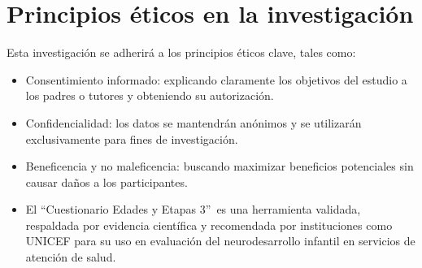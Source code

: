 \documentclass[11pt,letterpaper]{report}
\newcommand{\asq}{“Cuestionario Edades y Etapas 3”}
\begin{document}
\section{Principios éticos en la investigación}
Esta investigación se adherirá a los principios éticos clave, tales como:
\begin{itemize}
	\item Consentimiento informado: explicando claramente los objetivos del
	estudio a los padres o tutores y obteniendo su autorización.

	\item Confidencialidad: los datos se mantendrán anónimos y se utilizarán 
	exclusivamente para fines de investigación.

	\item Beneficencia y no maleficencia: buscando maximizar beneficios
	potenciales sin causar daños a los participantes.

	\item El \asq\ es una herramienta validada, respaldada por evidencia
	científica y recomendada por instituciones como UNICEF para su uso en
	evaluación del neurodesarrollo infantil en servicios de atención de
	salud. \cite{UNICEFrespaldo}
\end{itemize}

\printbibliography
\end{document}
